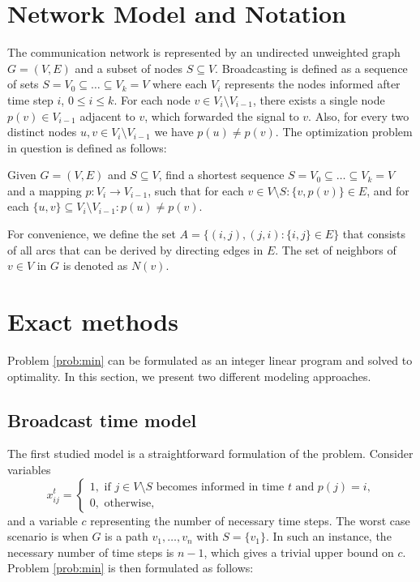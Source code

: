 \section{Network Model and Notation}

The communication network is represented by an undirected unweighted graph $G=(V,E)$ and a subset of nodes $S\subseteq V$. 
Broadcasting is defined as a sequence of sets $S=V_0\subseteq\dots\subseteq V_k = V$ where each $V_i$ represents the nodes informed after time step $i$, $0\leq i\leq k$.
For each node $v\in V_i\setminus V_{i-1}$, there exists a single node $p(v)\in V_{i-1}$ adjacent to $v$, which forwarded the signal to $v$.
Also, for every two distinct nodes $u,v\in V_i\setminus V_{i-1}$ we have $p(u)\neq p(v)$.
The optimization problem in question is defined as follows:
\begin{problem}\label{prob:min}
Given $G=(V,E)$ and $S\subseteq V$, find a shortest sequence $S=V_0\subseteq\dots\subseteq V_k=V$ and a mapping $p:V_i\to V_{i-1}$, such that for each $v\in V\setminus S:\{v,p(v)\}\in E$, and for each $\{u,v\}\subseteq V_i\setminus V_{i-1}: p(u)\neq p(v)$.
\end{problem}
For convenience, we define the set $A=\{(i,j),(j,i):\{i,j\}\in E\}$ that consists of all arcs that can be derived by directing edges in $E$.
The set of neighbors of $v\in V$ in $G$ is denoted as $N(v)$.
\section{Exact methods}

Problem \ref{prob:min} can be formulated as an integer linear program and solved to optimality. In this section, we present two different modeling approaches. 

\subsection{Broadcast time model}
The first studied model is a straightforward formulation of the problem. Consider variables $$ x_{ij}^t=\begin{cases} 1, \text{ if } j\in V\setminus S \text{ becomes informed in time } t \text{ and } p(j)=i,\\ 0, \text{ otherwise},
\end{cases}
$$
and a variable $c$ representing the number of necessary time steps.
The worst case scenario is when $G$ is a path $v_1,\dots,v_n$ with $S=\{v_1\}$. 
In such an instance, the necessary number of time steps is $n-1$, which gives a trivial upper bound on $c$.
Problem \ref{prob:min} is then formulated as follows: 

